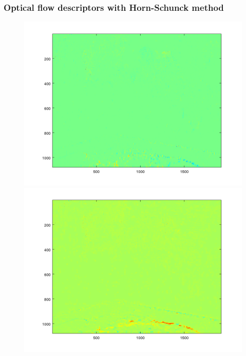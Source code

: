 \documentclass[french]{beamer}
\begin{document}
	\begin{frame}
		\frametitle{Optical flow descriptors with Horn-Schunck method}
		
		\begin{figure}[h]
			\begin{minipage}[b]{.49\linewidth}
				\includegraphics[width=1.0\textwidth]{ofx.png}
			\end{minipage}
			\hfill
			\begin{minipage}[b]{0.49\linewidth}
				\includegraphics[width=1.0\textwidth]{ofy.png}
			\end{minipage}
			\label{fig:f}
		\end{figure}
		
	\end{frame}
	
\end{document}
